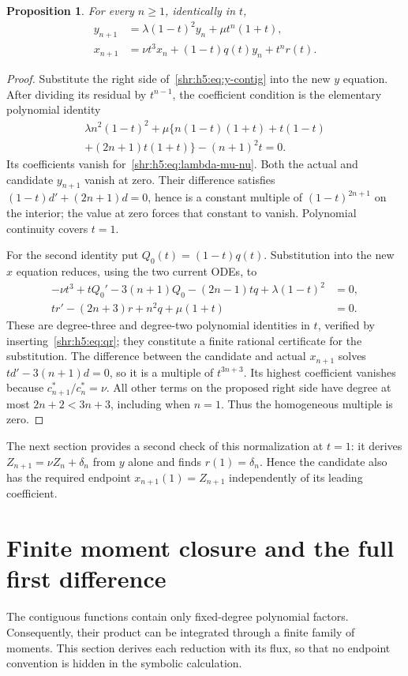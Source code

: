 \documentclass[11pt,letterpaper]{article}
\numberwithin{equation}{section}
\newtheorem{proposition}[theorem]{Proposition}
\theoremstyle{definition}
\newcommand{\1}{\mathbf 1}
\begin{document}
\begin{proposition}\label{shr:h5:prop:contiguity}
For every $n\ge1$, identically in $t$,
\begin{align}
 y_{n+1}&=\lambda(1-t)^2y_n+\mu t^n(1+t),
 \label{shr:h5:eq:y-contig}\\
 x_{n+1}&=\nu t^3x_n+(1-t)q(t)y_n+t^nr(t).
 \label{shr:h5:eq:x-contig}
\end{align}
\end{proposition}
\begin{proof}
Substitute the right side of~\eqref{shr:h5:eq:y-contig} into the new
$y$ equation. After dividing its residual by $t^{n-1}$, the coefficient
condition is the elementary polynomial identity
\begin{multline}
 \lambda n^2(1-t)^2+\mu\{n(1-t)(1+t)+t(1-t)\\
 +(2n+1)t(1+t)\}-(n+1)^2t=0.
 \label{shr:h5:eq:y-certificate}
\end{multline}
Its coefficients vanish for~\eqref{shr:h5:eq:lambda-mu-nu}. Both the actual
and candidate $y_{n+1}$ vanish at zero. Their difference satisfies
$(1-t)d'+(2n+1)d=0$, hence is a constant multiple of
$(1-t)^{2n+1}$ on the interior; the value at zero forces that constant
to vanish. Polynomial continuity covers $t=1$.

For the second identity put $Q_0(t)=(1-t)q(t)$. Substitution into the
new $x$ equation reduces, using the two current ODEs, to
\begin{align}
 -\nu t^3+tQ_0'-3(n+1)Q_0-(2n-1)tq
       +\lambda(1-t)^2&=0,\\
 tr'-(2n+3)r+n^2q+\mu(1+t)&=0.
 \label{shr:h5:eq:x-certificate}
\end{align}
These are degree-three and degree-two polynomial identities in $t$,
verified by inserting~\eqref{shr:h5:eq:qr}; they constitute a finite rational
certificate for the substitution. The difference between the candidate
and actual $x_{n+1}$ solves $td'-3(n+1)d=0$, so it is a multiple of
$t^{3n+3}$. Its highest coefficient vanishes because
$c_{n+1}^*/c_n^*=\nu$. All other terms on the proposed right side
have degree at most $2n+2<3n+3$, including when $n=1$.
Thus the homogeneous multiple is zero.
\end{proof}
The next section provides a second check of this normalization at $t=1$:
it derives $Z_{n+1}=\nu Z_n+\delta_n$ from $y$ alone and finds
$r(1)=\delta_n$. Hence the candidate also has the required endpoint
$x_{n+1}(1)=Z_{n+1}$ independently of its leading coefficient.

\section{Finite moment closure and the full first difference}
\label{shr:h5:sec:moments}
The contiguous functions contain only fixed-degree polynomial factors.
Consequently, their product can be integrated through a finite family of
moments. This section derives each reduction with its flux, so that no
endpoint convention is hidden in the symbolic calculation.
\end{document}
